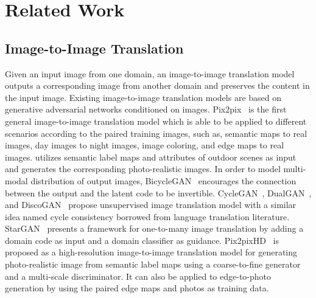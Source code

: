 \section{Related Work}

\subsection{Image-to-Image Translation}
Given an input image from one domain, an image-to-image translation model outputs a corresponding image from another domain and preserves the content in the input image. Existing image-to-image translation models are based on generative adversarial networks conditioned on images. 
%
Pix2pix~\cite{pix2pix} is the first general image-to-image translation model which is able to be applied to different scenarios according to the paired training images, such as, semantic maps to real images, day images to night images, image coloring, and edge maps to real images. 
%
\cite{outdoor_scene} utilizes semantic label maps and attributes of outdoor scenes as input and generates the corresponding photo-realistic images.
%
In order to model multi-modal distribution of output images, BicycleGAN~\cite{BicycleGAN} encourages the connection between the output and the latent code to be invertible.
%
CycleGAN~\cite{CycleGAN}, DualGAN~\cite{DualGAN}, and DiscoGAN~\cite{DiscoGAN} propose unsupervised image translation model with a similar idea named cycle consistency borrowed from language translation literature. 
%
StarGAN~\cite{StarGAN} presents a framework for one-to-many image translation by adding a domain code as input and a domain classifier as guidance.
%
Pix2pixHD~\cite{pix2pixHD} is proposed as a high-resolution image-to-image translation model for generating photo-realistic image from semantic label maps using a coarse-to-fine generator and a multi-scale discriminator. It can also be applied to edge-to-photo generation by using the paired edge maps and photos as training data.
%

